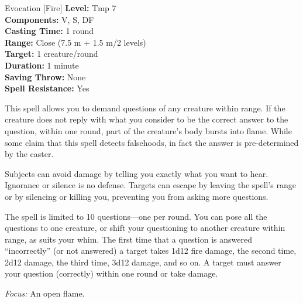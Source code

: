 {Evocation [Fire]}
{
	\textbf{Level:}
	Tmp 7\\
	\textbf{Components:}
	V, S, DF\\
	\textbf{Casting Time:}
	1 round\\
	\textbf{Range:}
	Close (7.5 m + 1.5 m/2 levels)\\
	\textbf{Target:}
	1 creature/round\\
	\textbf{Duration:}
	1 minute\\
	\textbf{Saving Throw:}
	None\\
	\textbf{Spell Resistance:}
	Yes\\
}
{
	This spell allows you to demand questions of any creature within range. If the creature does not reply with what you consider to be the correct answer to the question, within one round, part of the creature's body bursts into flame. While some claim that this spell detects falsehoods, in fact the answer is pre-determined by the caster.

	Subjects can avoid damage by telling you exactly what you want to hear. Ignorance or silence is no defense. Targets can escape by leaving the spell's range or by silencing or killing you, preventing you from asking more questions.

	The spell is limited to 10 questions---one per round. You can pose all the questions to one creature, or shift your questioning to another creature within range, as suits your whim. The first time that a question is answered ``incorrectly'' (or not answered) a target takes 1d12 fire damage, the second time, 2d12 damage, the third time, 3d12 damage, and so on. A target must answer your question (correctly) within one round or take damage.

	\textit{Focus:} An open flame.
}
